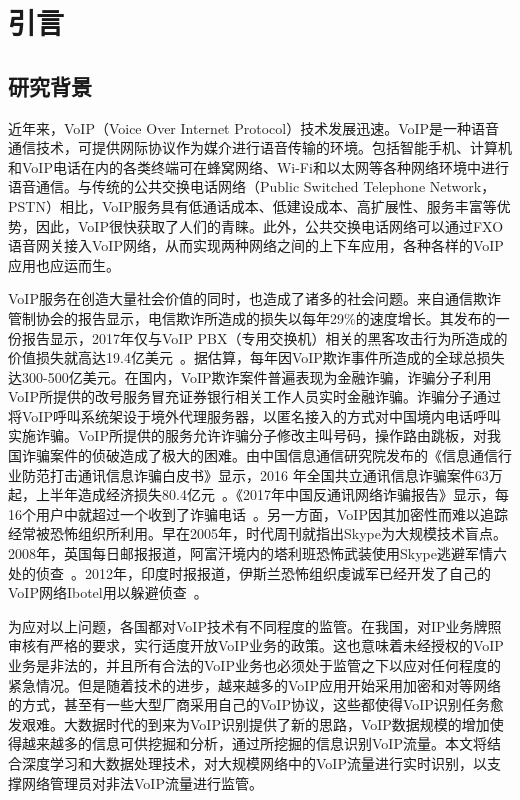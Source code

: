 
\chapter{引言}

\section{研究背景}
近年来，VoIP（Voice Over Internet Protocol）技术发展迅速。VoIP是一种语音通信技术，可提供网际协议作为媒介进行语音传输的环境。包括智能手机、计算机和VoIP电话在内的各类终端可在蜂窝网络、Wi-Fi和以太网等各种网络环境中进行语音通信。与传统的公共交换电话网络（Public Switched Telephone Network，PSTN）相比，VoIP服务具有低通话成本、低建设成本、高扩展性、服务丰富等优势，因此，VoIP很快获取了人们的青睐。此外，公共交换电话网络可以通过FXO语音网关接入VoIP网络，从而实现两种网络之间的上下车应用，各种各样的VoIP应用也应运而生。

VoIP服务在创造大量社会价值的同时，也造成了诸多的社会问题。来自通信欺诈管制协会的报告显示，电信欺诈所造成的损失以每年29\%的速度增长。其发布的一份报告显示，2017年仅与VoIP PBX（专用交换机）相关的黑客攻击行为所造成的价值损失就高达19.4亿美元~\supercite{cfca}。据估算，每年因VoIP欺诈事件所造成的全球总损失达300-500亿美元。在国内，VoIP欺诈案件普遍表现为金融诈骗，诈骗分子利用VoIP所提供的改号服务冒充证券银行相关工作人员实时金融诈骗。诈骗分子通过将VoIP呼叫系统架设于境外代理服务器，以匿名接入的方式对中国境内电话呼叫实施诈骗。VoIP所提供的服务允许诈骗分子修改主叫号码，操作路由跳板，对我国诈骗案件的侦破造成了极大的困难。由中国信息通信研究院发布的《信息通信行业防范打击通讯信息诈骗白皮书》显示，2016 年全国共立通讯信息诈骗案件63万起，上半年造成经济损失80.4亿元~\supercite{caict}。《2017年中国反通讯网络诈骗报告》显示，每16个用户中就超过一个收到了诈骗电话~\supercite{2017}。另一方面，VoIP因其加密性而难以追踪经常被恐怖组织所利用。早在2005年，时代周刊就指出Skype为大规模技术盲点。2008年，英国每日邮报报道，阿富汗境内的塔利班恐怖武装使用Skype逃避军情六处的侦查~\supercite{dailymail}。2012年，印度时报报道，伊斯兰恐怖组织虔诚军已经开发了自己的VoIP网络Ibotel用以躲避侦查~\supercite{timesofindia}。

为应对以上问题，各国都对VoIP技术有不同程度的监管。在我国，对IP业务牌照审核有严格的要求，实行适度开放VoIP业务的政策。这也意味着未经授权的VoIP业务是非法的，并且所有合法的VoIP业务也必须处于监管之下以应对任何程度的紧急情况。但是随着技术的进步，越来越多的VoIP应用开始采用加密和对等网络的方式，甚至有一些大型厂商采用自己的VoIP协议，这些都使得VoIP识别任务愈发艰难。大数据时代的到来为VoIP识别提供了新的思路，VoIP数据规模的增加使得越来越多的信息可供挖掘和分析，通过所挖掘的信息识别VoIP流量。本文将结合深度学习和大数据处理技术，对大规模网络中的VoIP流量进行实时识别，以支撑网络管理员对非法VoIP流量进行监管。

